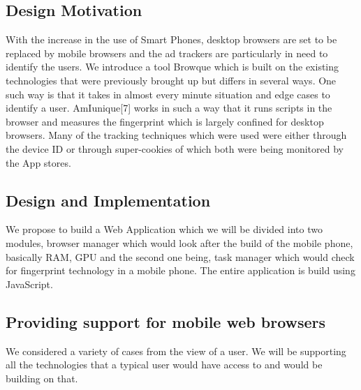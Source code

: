 \documentclass[journal]{IEEEtran}
\begin{document}
\subsection{Design Motivation}
With the increase in the use of Smart Phones, desktop browsers are set to be replaced by
mobile browsers and the ad trackers are particularly in need to identify the users. We
introduce a tool Browque which is built on the existing technologies that were previously
brought up but differs in several ways. One such way is that it takes in almost every
minute situation and edge cases to identify a user. AmIunique[7] works in such a way that
it runs scripts in the browser and measures the fingerprint which is largely confined for
desktop browsers. Many of the tracking techniques which were used were either through the
device ID or through super-cookies of which both were being monitored by the App stores.

\subsection{Design and Implementation}
We propose to build a Web Application which we will be divided into two modules, browser
manager which would look after the build of the mobile phone, basically RAM, GPU and the
second one being, task manager which would check for fingerprint technology in a mobile
phone. The entire application is build using JavaScript.

\subsection{Providing support for mobile web browsers}

We considered a variety of cases from the view of a user. We will be supporting all the
technologies that a typical user would have access to and would be building on that.
\end{document}
